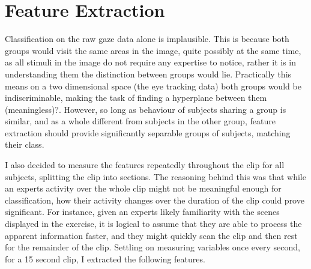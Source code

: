 \documentclass{report}
\begin{document}
{		\section{Feature Extraction}
			Classification on the raw gaze data alone is implausible. This is because both groups would visit the same areas in the image, quite possibly at the same time, as all stimuli in the image do not require any expertise to notice, rather it is in understanding them the distinction between groups would lie. Practically this means on a two dimensional space (the eye tracking data) both groups would be indiscriminable, making the task of finding a hyperplane between them (meaningless)?. However, so long as behaviour of subjects sharing a group is similar, and as a whole different from subjects in the other group, feature extraction should provide significantly separable groups of subjects, matching their class.
			
			I also decided to measure the features repeatedly throughout the clip for all subjects, splitting the clip into sections. The reasoning behind this was that while an experts activity over the whole clip might not be meaningful enough for classification, how their activity changes over the duration of the clip could prove significant. For instance, given an experts likely familiarity with the scenes displayed in the exercise, it is logical to assume that they are able to process the apparent information faster, and they might quickly scan the clip and then rest for the remainder of the clip. Settling on measuring variables once every second, for a 15 second clip, I extracted the following features.
}
\end{document}
